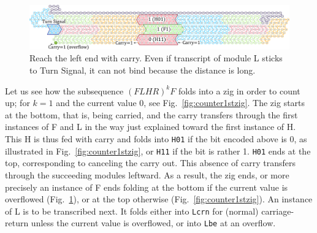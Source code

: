 \documentclass[twocolumn]{svjour3}
\begin{document}
\begin{figure}[tb]
\centering
\includegraphics[width=\linewidth]{fig/svg/CounterEx13_1.pdf}
\caption{
Reach the left end with carry.
Even if transcript of module L sticks to Turn Signal, it can not bind because the distance is long.
}
\label{fig:overflowex1}
\end{figure}

Let us see how the subsequence $(FLHR)^kF$ folds into a zig in order to count up; for $k=1$ and the current value 0, see Fig.~\ref{fig:counter1stzig}.
The zig starts at the bottom, that is, being carried, and the carry transfers through the first instances of F and L in the way just explained toward the first instance of H.
This H is thus fed with carry and folds into \texttt{H01} if the bit encoded above is 0, as illustrated in Fig.~\ref{fig:counter1stzig}, or \texttt{H11} if the bit is rather 1.
\texttt{H01} ends at the top, corresponding to canceling the carry out.
This absence of carry transfers through the succeeding modules leftward.
As a result, the zig ends, or more precisely an instance of F ends folding at the bottom if the current value is overflowed (Fig.~\ref{fig:overflowex1}), or at the top otherwise (Fig.~\ref{fig:counter1stzig}).
An instance of L is to be transcribed next.
It folds either into \texttt{Lcrn} for (normal) carriage-return unless the current value is overflowed, or into \texttt{Lbe} at an overflow.


\end{document}
